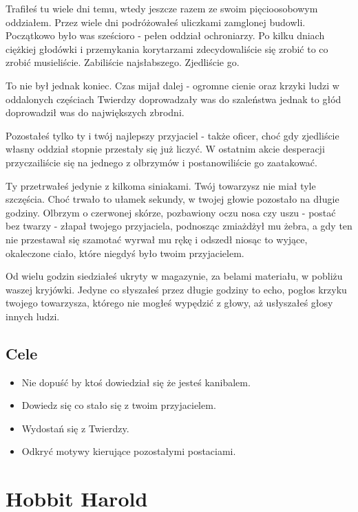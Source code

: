 \documentclass[12pt,a4paper]{article}
\begin{document}
Trafiłeś tu wiele dni temu, wtedy jeszcze razem ze swoim
pięcioosobowym oddziałem. Przez wiele dni podróżowałeś uliczkami
zamglonej budowli. Początkowo było was sześcioro - pełen oddział
ochroniarzy. Po kilku dniach ciężkiej głodówki i przemykania
korytarzami zdecydowaliście się zrobić to co zrobić
musieliście. Zabiliście najsłabszego. Zjedliście go.

To nie był jednak koniec. Czas mijał dalej - ogromne cienie oraz
krzyki ludzi w oddalonych częściach Twierdzy doprowadzały was do
szaleństwa jednak to głód doprowadził was do największych zbrodni.

Pozostałeś tylko ty i twój najlepszy przyjaciel - także oficer, choć
gdy zjedliście własny oddział stopnie przestały się już liczyć. W
ostatnim akcie desperacji przyczailiście się na jednego z olbrzymów i
postanowiliście go zaatakować.

Ty przetrwałeś jedynie z kilkoma siniakami. Twój towarzysz nie miał
tyle szczęścia. Choć trwało to ułamek sekundy, w twojej głowie
pozostało na długie godziny. Olbrzym o czerwonej skórze, pozbawiony
oczu nosa czy uszu - postać bez twarzy - złapał twojego przyjaciela,
podnosząc zmiażdżył mu żebra, a gdy ten nie przestawał się szamotać
wyrwał mu rękę i odszedł niosąc to wyjące, okaleczone ciało, które
niegdyś było twoim przyjacielem.

Od wielu godzin siedziałeś ukryty w magazynie, za belami materiału, w
pobliżu waszej kryjówki. Jedyne co słyszałeś przez długie godziny to
echo, pogłos krzyku twojego towarzysza, którego nie mogłeś wypędzić z
głowy, aż usłyszałeś głosy innych ludzi.

\subsection*{Cele}
\begin{itemize}
\item Nie dopuść by ktoś dowiedział się że jesteś kanibalem.
\item Dowiedz się co stało się z twoim przyjacielem.
\item Wydostań się z Twierdzy.
\item Odkryć motywy kierujące pozostałymi postaciami.
\end{itemize}

\clearpage

\section*{Hobbit Harold}
\end{document}
